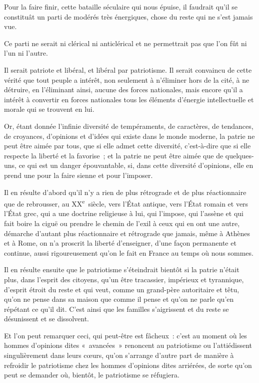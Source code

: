\documentclass[french,twoside]{book} %
\begin{document}
\noindent Pour la faire finir, cette bataille séculaire qui nous épuise, il faudrait qu’il se constituât un parti de modérés très énergiques, chose du reste qui ne s’est jamais vue.\par
Ce parti ne serait ni clérical ni anticlérical et ne permettrait pas que l’on fût ni l’un ni l’autre.\par
Il serait patriote et libéral, et libéral par patriotisme. Il serait convaincu de cette vérité que tout peuple a intérêt, non seulement à n’éliminer hors de la cité, à ne détruire, en l’éliminant ainsi, aucune des forces nationales, mais encore qu’il a intérêt à convertir en forces nationales tous les éléments d’énergie intellectuelle et morale qui se trouvent en lui.\par
Or, étant donnée l’infinie diversité de tempéraments, de caractères, de tendances, de croyances, d’opinions et d’idées qui existe dans le monde moderne, la patrie ne peut être aimée par tous, que si elle admet cette diversité, c’est-à-dire que si elle respecte la liberté et la favorise ; et la patrie  ne peut être aimée que de quelques-uns, ce qui est un danger épouvantable, si, dans cette diversité d’opinions, elle en prend une pour la faire sienne et pour l’imposer.\par
Il en résulte d’abord qu’il n’y a rien de plus rétrograde et de plus réactionnaire que de rebrousser, au \textsc{XX}\textsuperscript{e} siècle, vers l’État antique, vers l’État romain et vers l’État grec, qui a une doctrine religieuse à lui, qui l’impose, qui l’assène et qui fait boire la ciguë ou prendre le chemin de l’exil à ceux qui en ont une autre, démarche d’autant plus réactionnaire et rétrograde que jamais, même à Athènes et à Rome, on n’a proscrit la liberté d’enseigner, d’une façon permanente et continue, aussi rigoureusement qu’on le fait en France au temps où nous sommes.\par
Il en résulte ensuite que le patriotisme s’éteindrait bientôt si la patrie n’était plus, dans l’esprit des citoyens, qu’un être tracassier, impérieux et tyrannique, d’esprit étroit du reste et qui veut, comme un grand-père autoritaire et têtu, qu’on ne pense dans sa maison que comme il pense et qu’on ne parle qu’en répétant ce qu’il dit. C’est ainsi que les familles s’aigrissent et du reste se désunissent et se dissolvent.\par
Et l’on peut remarquer ceci, qui peut-être est fâcheux : c’est au moment où les hommes d’opinions  dites « avancées » renoncent au patriotisme ou l’attiédissent singulièrement dans leurs cœurs, qu’on s’arrange d’autre part de manière à refroidir le patriotisme chez les hommes d’opinions dites arriérées, de sorte qu’on peut se demander où, bientôt, le patriotisme se réfugiera.\par
\end{document}
